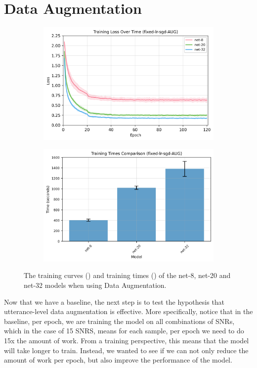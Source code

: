 \documentclass[logo,bsc,singlespacing,parskip,online]{infthesis}
\begin{document}
\section{Data Augmentation}
\label{sec:data-augmentation}
\begin{figure}[h]
   \centering
   \begin{subfigure}[b]{0.48\textwidth}
      \centering
      \includegraphics[width=\textwidth]{fixed-lr-sgd-AUG_training_losses.png}
      \caption{}
      \label{fig:data-augmentation-losses}
   \end{subfigure}
   \hfill
   \begin{subfigure}[b]{0.48\textwidth}
      \centering
      \includegraphics[width=\textwidth]{fixed-lr-sgd-AUG_training_times.png}
      \caption{}
      \label{fig:data-augmentation-times}
   \end{subfigure}
   \caption{The training curves () and training times () of the net-8, net-20 and net-32 models when using Data Augmentation.}
\end{figure}
Now that we have a baseline, the next step is to test the hypothesis 
that utterance-level data augmentation is effective. More specifically, 
notice that in the baseline, per epoch, we are training the model on all 
combinations of SNRs, which in the case of 15 SNRS, means for each sample,
per epoch we need to do 15x the amount of work. From a training perspective, 
this means that the model will take longer to train. Instead, we wanted 
to see if we can not only reduce the amount of work per epoch, but also 
improve the performance of the model.
\end{document}
